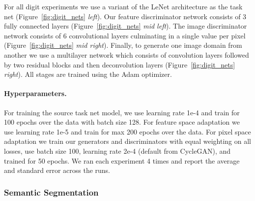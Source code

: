 For all digit experiments we use a variant of the LeNet architecture as the task net (Figure~\ref{fig:digit_nets} \textit{left}). Our feature discriminator network consists of 3 fully connected layers (Figure~\ref{fig:digit_nets} \textit{mid left}). The image discriminator network consists of 6 convolutional layers culminating in a single value per pixel (Figure~\ref{fig:digit_nets} \textit{mid right}). Finally, to generate one image domain from another we use a multilayer network which consists of convolution layers followed by two residual blocks and then deconvolution layers (Figure~\ref{fig:digit_nets} \textit{right}). 
All stages are trained using the Adam optimizer. 

\paragraph{Hyperparameters.} For training the source task net model, we use learning rate 1e-4 and train for 100 epochs over the data with batch size 128. For feature space adaptation we use learning rate 1e-5 and train for max 200 epochs over the data. For pixel space adaptation we train our generators and discriminators with equal weighting on all losses, use batch size 100, learning rate 2e-4 (default from CycleGAN), and trained for 50 epochs. We ran each experiment 4 times and report the average and standard error across the runs.




\subsubsection{Semantic Segmentation}
\label{sec:ss-details}


